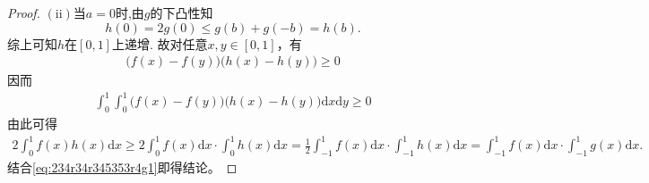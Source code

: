 \documentclass[../../main.tex]{subfiles}
\begin{document}
\begin{proof}
$\left( \mathrm{ii} \right)$当$a=0$时,由$g$的下凸性知
$$h\left( 0 \right) =2g\left( 0 \right) \leqslant g\left( b \right) +g\left( -b \right) =h\left( b \right).$$
综上可知$h$在$\left[ 0,1 \right]$上递增.
故对任意$x,y \in [0,1]$，有
\begin{align*}
\bigl(f(x) - f(y)\bigr)\bigl(h(x) - h(y)\bigr) \geqslant 0
\end{align*}
因而
\begin{align*}
\int_0^1 \int_0^1 \bigl(f(x) - f(y)\bigr)\bigl(h(x) - h(y)\bigr)\mathrm{d}x\mathrm{d}y \geqslant 0
\end{align*}
由此可得
\begin{align*}
2\int_0^1 f(x)h(x)\mathrm{d}x \geqslant 2\int_0^1 f(x)\mathrm{d}x \cdot \int_0^1 h(x)\mathrm{d}x = \frac{1}{2}\int_{-1}^1 f(x)\mathrm{d}x \cdot \int_{-1}^1 h(x)\mathrm{d}x = \int_{-1}^1 f(x)\mathrm{d}x \cdot \int_{-1}^1 g(x)\mathrm{d}x.
\end{align*}
结合\eqref{eq:234r34r345353r4g1}即得结论。

\end{proof}
\end{document}

